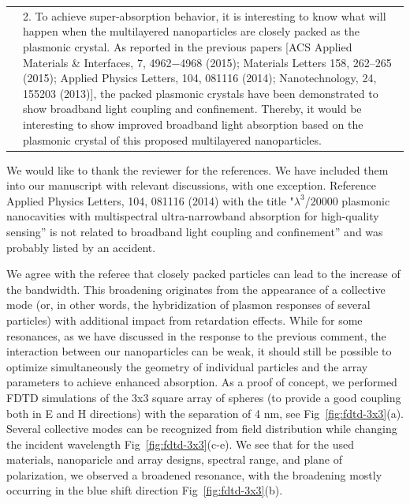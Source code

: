 \documentclass[a4paper]{article}
\begin{document}





\begin{tabular}[!H]{l|p{}}
  \quad & 2. To achieve super-absorption behavior, it is interesting
  to know what will happen when the multilayered nanoparticles are
  closely packed as the plasmonic crystal. As reported in the previous
  papers [ACS Applied Materials \& Interfaces, 7, 4962−4968 (2015);
  Materials Letters 158, 262–265 (2015); Applied Physics Letters, 104,
  081116 (2014); Nanotechnology, 24, 155203 (2013)], the packed
  plasmonic crystals have been demonstrated to show broadband light
  coupling and confinement. Thereby, it would be interesting to show
  improved broadband light absorption based on the plasmonic crystal
  of this proposed multilayered nanoparticles. 
\end{tabular}

We would like to thank the reviewer for the references. We have
included them into our manuscript with relevant discussions, with one
exception. Reference Applied Physics Letters, 104, 081116 (2014) with
the title "$\lambda^3$/20000 plasmonic nanocavities with multispectral
ultra-narrowband absorption for high-quality sensing'' is not related
to broadband light coupling and confinement'' and was probably listed
by an accident.

We agree with the referee that closely packed particles can lead to
the increase of the bandwidth. This broadening originates from the
appearance of a collective mode (or, in other words, the hybridization
of plasmon responses of several particles) with additional impact from
retardation effects. While for some resonances, as we have discussed
in the response to the previous comment, the interaction between our
nanoparticles can be weak, it should still be possible to optimize
simultaneously the geometry of individual particles and the array
parameters to achieve enhanced absorption. As a proof of concept, we
performed FDTD simulations of the 3x3 square array of spheres (to
provide a good coupling both in E and H directions) with the
separation of 4 nm, see Fig~\ref{fig:fdtd-3x3}(a). Several collective
modes can be recognized from field distribution while changing the
incident wavelength Fig~\ref{fig:fdtd-3x3}(c-e). We see that for the
used materials, nanoparicle and array designs, spectral range, and
plane of polarization, we observed a broadened resonance, with the
broadening mostly occurring in the blue shift direction
Fig~\ref{fig:fdtd-3x3}(b).
\end{document}
